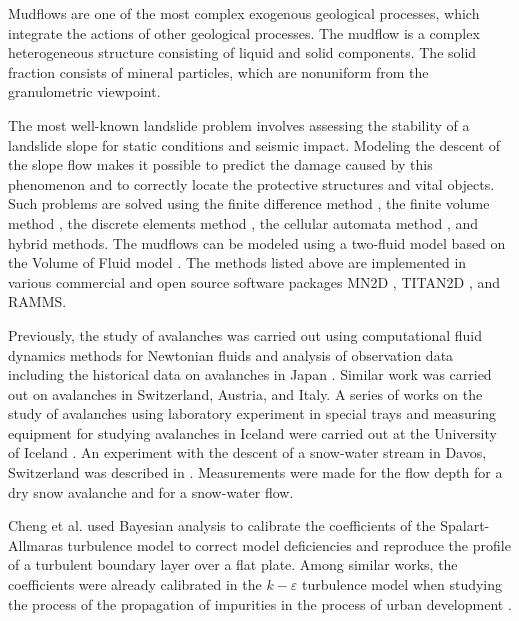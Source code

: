 \documentclass[mathematics,article,submit,pdftex,moreauthors]{Definitions/mdpi}
\begin{document}
Mudflows are one of the most complex exogenous geological processes, which integrate the actions of other geological processes. The mudflow is a complex heterogeneous structure consisting of liquid and solid components. The solid fraction consists of mineral particles, which are nonuniform from the granulometric viewpoint.


The most well-known landslide problem involves assessing the stability of a landslide slope for static conditions and seismic impact. Modeling the descent of the slope flow makes it possible to predict the damage caused by this phenomenon and to correctly locate the protective structures and vital objects. Such problems are solved using the finite difference method \cite{Bernander2016}, the finite volume method \cite{liu2007application}, the discrete elements method \cite{Liu2020}, the cellular automata method  \cite{piegari2006cellular}, and hybrid methods. The mudflows can be modeled using a two-fluid model based on the Volume of Fluid model \cite{Hirt1981}. The methods listed above are implemented in various commercial and open source software packages MN2D \cite{Naaim2002}, TITAN2D \cite{Pitman2003}, and RAMMS.

Previously, the study of avalanches was carried out using computational fluid dynamics methods for Newtonian fluids and analysis of observation data including the historical data on avalanches in Japan \cite{Oda2011, Yamaguchi2017}. Similar work was carried out on avalanches in Switzerland, Austria, and Italy. A series of works on the study of avalanches using laboratory experiment in special trays and measuring equipment for studying avalanches in Iceland were carried out at the University of Iceland  \cite{IceThesKatr, IceThesJon}. An experiment with the descent of a snow-water stream in Davos, Switzerland was described in \cite{Jaedicke2006}. Measurements were made for the flow depth for a dry snow avalanche and for a snow-water flow.

Cheng et al. \cite{Cheung2011} used Bayesian analysis to calibrate the coefficients of the Spalart-Allmaras turbulence model to correct model deficiencies and reproduce the profile of a turbulent boundary layer over a flat plate. Among similar works, the coefficients were already calibrated in the $k-\varepsilon$ turbulence model when studying the process of the propagation of impurities in the process of urban development \cite{Guillas2014}.
\end{document}
